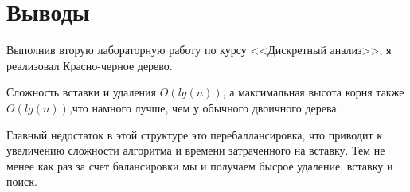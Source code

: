\section{Выводы}
Выполнив вторую лабораторную работу по курсу <<Дискретный анализ>>, я реализовал Красно-черное дерево.

Сложность вставки и удаления $O(lg(n))$, а максимальная высота корня также $O(lg(n))$,что намного лучше, чем у обычного двоичного дерева.

Главный недостаток в этой структуре это перебаллансировка, что приводит к увеличению сложности алгоритма и времени затраченного на вставку. Тем не менее как раз за счет балансировки мы и получаем бысрое удаление, вставку и поиск.
\pagebreak
